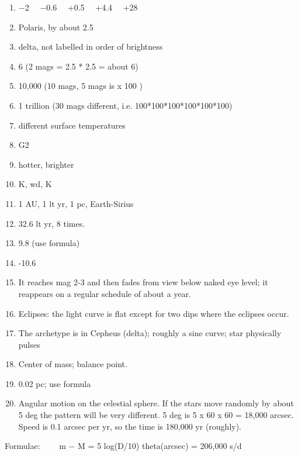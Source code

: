 \documentclass[11pt]{article}
\begin{document}
\begin{enumerate} 

\item
$-$2  \ \ $-$0.6 \ \  +0.5 \ \ +4.4 \ \ +28


\item 
Polaris, by about 2.5


\item
delta, not labelled in order of brightness

\item 
6 (2 mags = 2.5 * 2.5 = about 6)

\item 
10,000  (10 mags, 5 mags is x 100 )

\item 
1 trillion  (30 mags different, i.e. 100*100*100*100*100*100)


\item
different surface temperatures 


\item 
G2

\item 
hotter, brighter

\item 
K, wd, K


\item
1 AU,  1 lt yr, 1 pc,  Earth-Sirius

\item 
32.6 lt yr, 8 times.

\item 
9.8 (use formula)

\item 
-10.6

\item 
It reaches mag 2-3 and then fades from view below naked eye level; it
reappears on a regular schedule of about a year.

\item 
Eclipses: the light curve is flat except for two dips where the
eclipses occur.

\item 
The archetype is in Cepheus (delta); roughly a sine curve;  
star physically pulses


\item 
Center of mass; balance point.

\item 
0.02 pc; use formula

\item 
Angular motion on the celestial sphere.
If the stars move randomly by about 5 deg the pattern will be very
different. 5 deg is 5 x 60 x 60 = 18,000 arcsec. Speed is
0.1 arcsec per yr, so the time is 180,000 yr (roughly).

\end{enumerate} 

Formulae: \ \ \ \ m $-$ M = 5 log(D/10) \hspace{2cm} theta(arcsec) = 206,000 s/d
\end{document}
